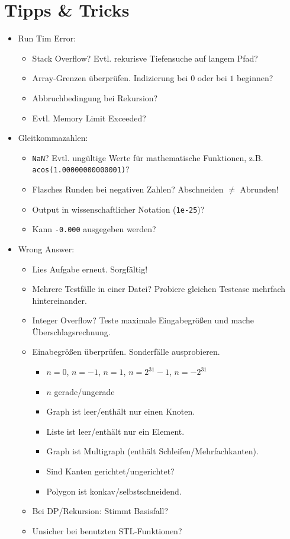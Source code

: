 \section{Tipps \& Tricks}

\begin{itemize}
	\item Run Tim Error:
	\begin{itemize}
		\item Stack Overflow? Evtl. rekurisve Tiefensuche auf langem Pfad?
		\item Array-Grenzen überprüfen. Indizierung bei $0$ oder bei $1$ beginnen?
		\item Abbruchbedingung bei Rekursion?
		\item Evtl. Memory Limit Exceeded?
	\end{itemize}

	\item Gleitkommazahlen:
	\begin{itemize}
		\item \lstinline{NaN}? Evtl. ungültige Werte für mathematische Funktionen, z.B. \lstinline{acos(1.00000000000001)}?
		\item Flasches Runden bei negativen Zahlen? Abschneiden $\neq$ Abrunden!
		\item Output in wissenschaftlicher Notation (\lstinline{1e-25})?
		\item Kann \lstinline{-0.000} ausgegeben werden?
	\end{itemize}

	\item Wrong Answer:
	\begin{itemize}
		\item Lies Aufgabe erneut. Sorgfältig!
		\item Mehrere Testfälle in einer Datei? Probiere gleichen Testcase mehrfach hintereinander.
		\item Integer Overflow? Teste maximale Eingabegrößen und mache Überschlagsrechnung.
		\item Einabegrößen überprüfen. Sonderfälle ausprobieren.
		\begin{itemize}
			\item $n = 0$, $n = -1$, $n = 1$, $n = 2^{31}-1$, $n = -2^{31}$
			\item $n$ gerade/ungerade
			\item Graph ist leer/enthält nur einen Knoten.
			\item Liste ist leer/enthält nur ein Element.
			\item Graph ist Multigraph (enthält Schleifen/Mehrfachkanten).
			\item Sind Kanten gerichtet/ungerichtet?
			\item Polygon ist konkav/selbstschneidend.
		\end{itemize}
		\item Bei DP/Rekursion: Stimmt Basisfall?
		\item Unsicher bei benutzten STL-Funktionen?
	\end{itemize}
\end{itemize}
